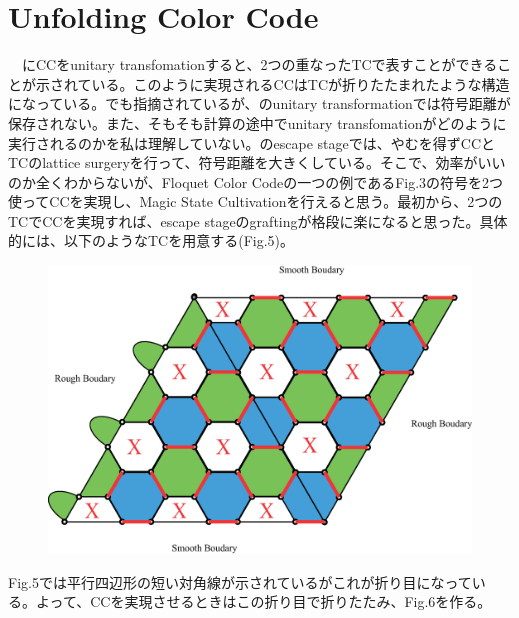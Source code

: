 \documentclass[a4paper,9pt]{ltjsarticle}
\begin{document}
\section{Unfolding Color Code}
  　\cite{kubica2015}にCCをunitary transfomationすると、2つの重なったTCで表すことができることが示されている。このように実現されるCCはTCが折りたたまれたような構造になっている。\cite{gidney2024}でも指摘されているが、\cite{kubica2015}のunitary transformationでは符号距離が保存されない。また、そもそも計算の途中でunitary transfomationがどのように実行されるのかを私は理解していない。\cite{gidney2024}のescape stageでは、やむを得ずCCとTCのlattice surgeryを行って、符号距離を大きくしている。そこで、効率がいいのか全くわからないが、Floquet Color Codeの一つの例であるFig.3の符号を2つ使ってCCを実現し、Magic State Cultivationを行えると思う。最初から、2つのTCでCCを実現すれば、escape stageのgraftingが格段に楽になると思った。具体的には、以下のようなTCを用意する(Fig.5)。
  \begin{figure}[h]
    \centering
    \includegraphics[scale=0.30]{figure/figure5.eps}
    \vspace{10pt}\caption{}
    \label{figure5}
    \vspace{-15pt}
  \end{figure}
  \clearpage
  Fig.5では平行四辺形の短い対角線が示されているがこれが折り目になっている。よって、CCを実現させるときはこの折り目で折りたたみ、Fig.6を作る。
\end{document}
